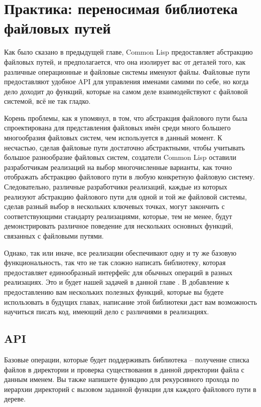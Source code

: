 \chapter{Практика: переносимая библиотека файловых путей}
\label{ch:15}

Как было сказано в предыдущей главе, Common Lisp предоставляет абстракцию файловых путей,
и предполагается, что она изолирует вас от деталей того, как различные операционные и
файловые системы именуют файлы. Файловые пути предоставляют удобное API для управления
именами самими по себе, но когда дело доходит до функций, которые на самом деле
взаимодействуют с файловой системой, всё не так гладко.

Корень проблемы, как я упомянул, в том, что абстракция файлового пути была спроектирована
для представления файловых имён среди много большего многообразия файловых систем, чем
используется в данный момент. К несчастью, сделав файловые пути достаточно абстрактными,
чтобы учитывать большое разнообразие файловых систем, создатели Common Lisp оставили
разработчикам реализаций на выбор многочисленные варианты, как точно отображать абстракцию
файлового пути в любую конкретную файловую систему. Следовательно, различные разработчики
реализаций, каждые из которых реализуют абстракцию файлового пути для одной и той же
файловой системы, сделав разный выбор в нескольких ключевых точках, могут закончить с
соответствующими стандарту реализациями, которые, тем не менее, будут демонстрировать
различное поведение для нескольких основных функций, связанных с файловыми путями.

Однако, так или иначе, все реализации обеспечивают одну и ту же базовую функциональность,
так что не так сложно написать библиотеку, которая предоставляет единообразный интерфейс
для обычных операций в разных реализациях. Это и будет нашей задачей в данной главе . В
добавление к предоставлению вам нескольких полезных функций, которые вы будете
использовать в будущих главах, написание этой библиотеки даст вам возможность научиться
писать код, имеющий дело с различиями в реализациях.

\section{API}

Базовые операции, которые будет поддерживать библиотека -- получение списка файлов в
директории и проверка существования в данной директории файла с данным именем. Вы также
напишете функцию для рекурсивного прохода по иерархии директорий с вызовом заданной
функции для каждого файлового пути в дереве.

